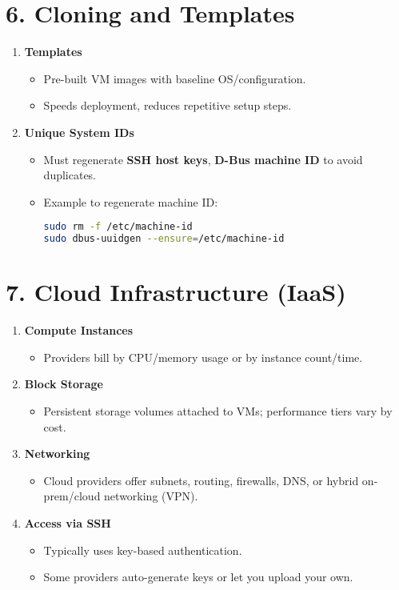 \documentclass[12pt,a4paper]{report}
\begin{document}
\section*{6. Cloning and Templates}

\begin{enumerate}
    \item \textbf{Templates}
    \begin{itemize}
        \item Pre-built VM images with baseline OS/configuration.
        \item Speeds deployment, reduces repetitive setup steps.
    \end{itemize}

    \item \textbf{Unique System IDs}
    \begin{itemize}
        \item Must regenerate \textbf{SSH host keys}, \textbf{D-Bus machine ID} to avoid duplicates.
        \item Example to regenerate machine ID:
        \begin{lstlisting}[language=bash]
sudo rm -f /etc/machine-id
sudo dbus-uuidgen --ensure=/etc/machine-id
        \end{lstlisting}
    \end{itemize}
\end{enumerate}

\section*{7. Cloud Infrastructure (IaaS)}

\begin{enumerate}
    \item \textbf{Compute Instances}
    \begin{itemize}
        \item Providers bill by CPU/memory usage or by instance count/time.
    \end{itemize}

    \item \textbf{Block Storage}
    \begin{itemize}
        \item Persistent storage volumes attached to VMs; performance tiers vary by cost.
    \end{itemize}

    \item \textbf{Networking}
    \begin{itemize}
        \item Cloud providers offer subnets, routing, firewalls, DNS, or hybrid on-prem/cloud networking (VPN).
    \end{itemize}

    \item \textbf{Access via SSH}
    \begin{itemize}
        \item Typically uses key-based authentication.
        \item Some providers auto-generate keys or let you upload your own.
    \end{itemize}
\end{enumerate}
\end{document}
